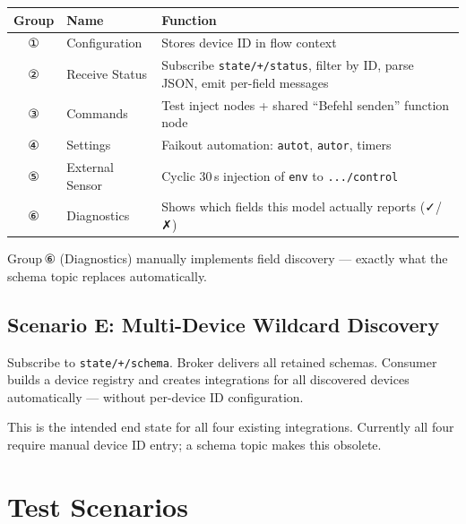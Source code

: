 \documentclass[11pt,a4paper]{article}
\newcommand{\topic}[1]{\texttt{\color{accent}#1}}
\newcommand{\field}[1]{\texttt{\color{codegreen}#1}}
\begin{document}
\begin{tabular}{@{}clL{7cm}@{}}
\toprule
\textbf{Group} & \textbf{Name} & \textbf{Function} \\
\midrule
{}
① & Configuration       & Stores device ID in flow context \\
② & Receive Status      & Subscribe \topic{state/+/status}, filter by ID, parse JSON, emit per-field messages \\
③ & Commands            & Test inject nodes + shared ``Befehl senden'' function node \\
④ & Settings            & Faikout automation: \field{autot}, \field{autor}, timers \\
⑤ & External Sensor     & Cyclic 30\,s injection of \field{env} to \topic{.../control} \\
⑥ & Diagnostics         & Shows which fields this model actually reports (✓/✗) \\
\bottomrule
\end{tabular}

\vspace{4pt}
Group\,⑥ (Diagnostics) manually implements field discovery — exactly what the schema topic replaces automatically.

\subsection{Scenario E: Multi-Device Wildcard Discovery}

Subscribe to \topic{state/+/schema}. Broker delivers all retained schemas. Consumer builds a device registry and creates integrations for all discovered devices automatically — without per-device ID configuration.

This is the intended end state for all four existing integrations. Currently all four require manual device ID entry; a schema topic makes this obsolete.

\section{Test Scenarios}
\end{document}
